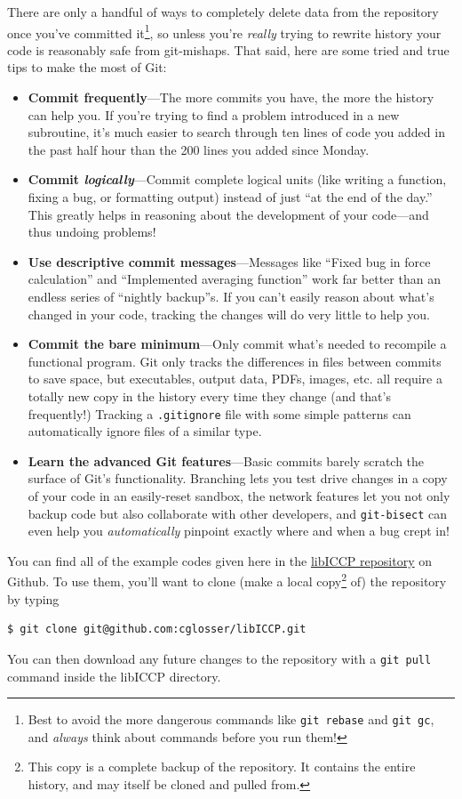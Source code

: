 \documentclass[openany,oneside]{report}
\begin{document}
There are only a handful of ways to completely delete data from the repository once you've committed it\footnote{Best to avoid the more dangerous commands like \texttt{git rebase} and \texttt{git gc}, and \emph{always} think about commands before you run them!}, so unless you're \emph{really} trying to rewrite history your code is reasonably safe from git-mishaps.
That said, here are some tried and true tips to make the most of Git:
\begin{itemize}
  \item \textbf{Commit frequently}---The more commits you have, the more the history can help you.
    If you're trying to find a problem introduced in a new subroutine, it's much easier to search through ten lines of code you added in the past half hour than the 200 lines you added since Monday.
  \item \textbf{Commit \emph{logically}}---Commit complete logical units (like writing a function, fixing a bug, or formatting output) instead of just ``at the end of the day.''
    This greatly helps in reasoning about the development of your code---and thus undoing problems!
  \item \textbf{Use descriptive commit messages}---Messages like ``Fixed bug in force calculation'' and ``Implemented averaging function'' work far better than an endless series of ``nightly backup''s.
    If you can't easily reason about what's changed in your code, tracking the changes will do very little to help you.
  \item \textbf{Commit the bare minimum}---Only commit what's needed to recompile a functional program.
    Git only tracks the differences in files between commits to save space, but executables, output data, PDFs, images, etc. all require a totally new copy in the history every time they change (and that's frequently!)
    Tracking a \texttt{.gitignore} file with some simple patterns can automatically ignore files of a similar type.
  \item \textbf{Learn the advanced Git features}---Basic commits barely scratch the surface of Git's functionality.
    Branching lets you test drive changes in a copy of your code in an easily-reset sandbox, the network features let you not only backup code but also collaborate with other developers, and \texttt{git-bisect} can even help you \emph{automatically} pinpoint exactly where and when a bug crept in!
\end{itemize}

You can find all of the example codes given here in the \href{https://Github.com/cglosser/libICCP}{libICCP repository} on Github. To use them, you'll want to clone (make a local copy\footnote{This copy is a complete backup of the repository. It contains the entire history, and may itself be cloned and pulled from.} of) the repository by typing
\begin{verbatim}
$ git clone git@github.com:cglosser/libICCP.git
\end{verbatim}
You can then download any future changes to the repository with a \texttt{git pull} command inside the libICCP directory.
\end{document}
